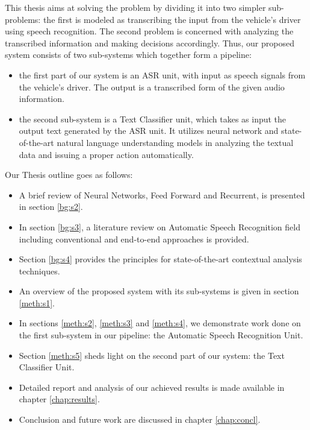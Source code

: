 This thesis aims at solving the problem by dividing it into two simpler sub-problems: the first is modeled as transcribing the input from the vehicle's driver using speech recognition. The second problem is concerned with analyzing the transcribed information and making decisions accordingly. Thus, our proposed system consists of two sub-systems which together form a pipeline: 

\begin{itemize}
	\item the first part of our system is an \ac{ASR} unit, with input as speech signals from the vehicle's driver. The output is a transcribed form of the given audio information.
	\item the second sub-system is a Text Classifier unit, which takes as input the output text generated by the \ac{ASR} unit. It utilizes neural network and state-of-the-art natural language understanding models in analyzing the textual data and issuing a proper action automatically.
\end{itemize}



Our Thesis outline goes as follows:

\begin{itemize}
	\item A brief review of Neural Networks, Feed Forward and Recurrent, is presented in section \ref{bg:s2}.
	\item In section \ref{bg:s3}, a literature review on Automatic Speech Recognition field including conventional and end-to-end approaches is provided.
	\item Section \ref{bg:s4} provides the principles for state-of-the-art contextual analysis techniques.
	\item An overview of the proposed system with its sub-systems is given in section \ref{meth:s1}.
	\item In sections \ref{meth:s2}, \ref{meth:s3} and \ref{meth:s4}, we demonstrate work done on the first sub-system in our pipeline: the Automatic Speech Recognition Unit.
	\item Section \ref{meth:s5} sheds light on the second part of our system: the Text Classifier Unit.
	\item Detailed report and analysis of our achieved results is made available in chapter \ref{chap:results}.
	\item Conclusion and future work are discussed in chapter \ref{chap:concl}.
\end{itemize}


